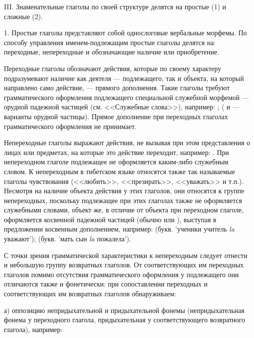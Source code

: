 III. Знаменательные глаголы по своей структуре делятся на простые (1) и сложные (2).

1. Простые глаголы представляют собой однослоговые вербальные морфемы. По способу управления именем-подлежащим простые глаголы делятся на: переходные, непереходные и обозначающие наличие или приобретение.

Переходные глаголы обозначают действия, которые по своему характеру подразумевают наличие как деятеля --- подлежащего, так и объекта, на который направлено само действие, --- прямого дополнения. Такие глаголы требуют грамматического оформления подлежащего специальной служебной морфемой --- орудной падежной частицей (см. <<Служебные слова>>), например:
;
( и  --- варианты орудной частицы). Прямое дополнение при переходных глаголах грамматического оформления не принимает.

Непереходные глаголы выражают действия, не вызывая при этом представления о лицах или предметах, на которые это действие переходит, например: . При непереходном глаголе подлежащее не оформляется каким-либо служебным словом. К непереходным в тибетском языке относятся также так называемые глаголы чувствования (<<любить>>, <<презирать>>, <<уважать>> и т.п.). Несмотря на наличие объекта действия у этих глаголов, они относятся к группе непереходных, поскольку подлежащее при этих глаголах также не оформляется служебными словами, объект же, в отличие от объекта при переходном глаголе, оформляется косвенной падежной частицей (обычно  или ), выступая в предложении косвенным дополнением, например:
 (букв. 'ученики учитель \emph{la} уважают');
 (букв. 'мать сын \emph{la} пожалела').

С точки зрения грамматической характеристики к непереходным следует отнести и небольшую группу возвратных глаголов. От соответствующих им переходных глаголов помимо отсутствия грамматического оформления у подлежащего они отличаются также и фонетически: при сопоставлении переходных и соответствующих им возвратных глаголов обнаруживаем:

а) оппозицию непридыхательной и придыхательной фонемы (непридыхательная фонема у переходного глагола, придыхательная у соответствующего возвратного глагола), например:

